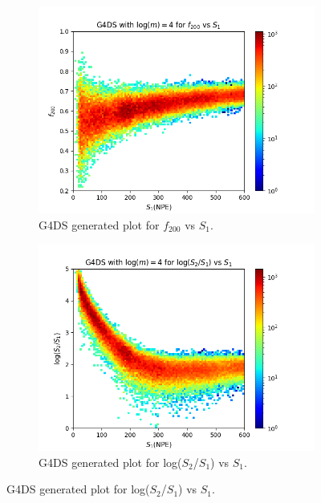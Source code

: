 \documentclass[11pt]{article} %
\begin{document}
\begin{figure}[H]
\centering
\begin{minipage}{\textwidth}
  \begin{subfigure}{.5\textwidth}
      \centering\captionsetup{width=.8\linewidth}%
      \includegraphics[scale=0.5]{./images/4/g4_f200_vs_s1.png}
      \caption{G4DS generated plot for $f_{200}$ vs $S_1$.}
  \end{subfigure}
  \begin{subfigure}{.5\textwidth}
      \centering\captionsetup{width=.8\linewidth}%
      \includegraphics[scale=0.5]{./images/4/g4_s1_over_s2_vs_s1.png}
      \caption{G4DS generated plot for log($S_2$/$S_1$) vs $S_1$.}
  \end{subfigure}

\end{minipage}
\end{figure}
\end{document}
